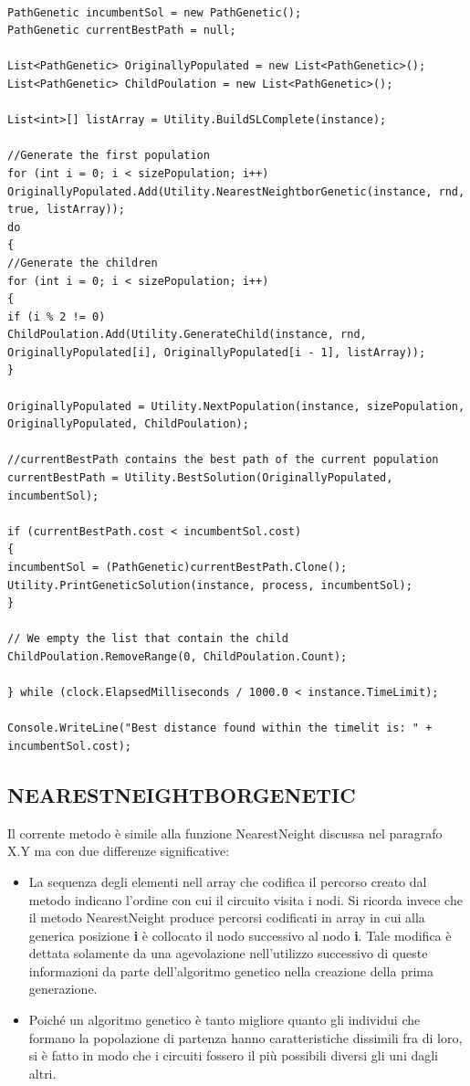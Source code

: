 \documentclass[11pt]{article}
\begin{document}
\begin{lstlisting}

PathGenetic incumbentSol = new PathGenetic();
PathGenetic currentBestPath = null;

List<PathGenetic> OriginallyPopulated = new List<PathGenetic>();
List<PathGenetic> ChildPoulation = new List<PathGenetic>();

List<int>[] listArray = Utility.BuildSLComplete(instance);

//Generate the first population
for (int i = 0; i < sizePopulation; i++)
OriginallyPopulated.Add(Utility.NearestNeightborGenetic(instance, rnd, true, listArray));
do
{
//Generate the children
for (int i = 0; i < sizePopulation; i++)
{
if (i % 2 != 0)
ChildPoulation.Add(Utility.GenerateChild(instance, rnd, OriginallyPopulated[i], OriginallyPopulated[i - 1], listArray));
}

OriginallyPopulated = Utility.NextPopulation(instance, sizePopulation, OriginallyPopulated, ChildPoulation);

//currentBestPath contains the best path of the current population
currentBestPath = Utility.BestSolution(OriginallyPopulated, incumbentSol);

if (currentBestPath.cost < incumbentSol.cost)
{
incumbentSol = (PathGenetic)currentBestPath.Clone();
Utility.PrintGeneticSolution(instance, process, incumbentSol);
}

// We empty the list that contain the child
ChildPoulation.RemoveRange(0, ChildPoulation.Count);

} while (clock.ElapsedMilliseconds / 1000.0 < instance.TimeLimit);

Console.WriteLine("Best distance found within the timelit is: " + incumbentSol.cost);

\end{lstlisting}

\subsection*{NEARESTNEIGHTBORGENETIC}

Il corrente metodo è simile alla funzione NearestNeight discussa nel paragrafo X.Y ma con due differenze significative:

\begin{itemize}
    \item La sequenza degli elementi nell array che codifica il percorso creato dal metodo indicano l'ordine con cui il circuito visita i nodi. Si ricorda invece che il metodo NearestNeight produce percorsi codificati in array in cui alla generica posizione \textbf{i} è collocato il nodo successivo al nodo \textbf{i}. Tale modifica è dettata solamente da una agevolazione nell'utilizzo successivo di queste informazioni da parte dell'algoritmo genetico nella creazione della prima generazione.
    
    \item Poiché un algoritmo genetico è tanto migliore quanto gli individui che formano la popolazione di partenza hanno caratteristiche dissimili fra di loro, si è fatto in modo che i circuiti fossero il più possibili diversi gli uni dagli altri.
\end{itemize}
\end{document}
